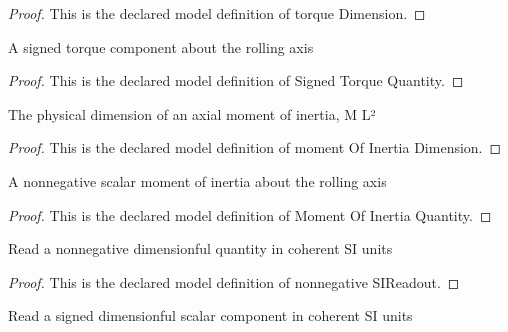 \begin{proof}
  This is the declared model definition of torque Dimension.
\end{proof}
\begin{definition}
  \label{def:physics:phyx-mini-0825:phyxminiproblems-problemphyxmini0825-signedtorquequantity}
  A signed torque component about the rolling axis
\end{definition}
\begin{proof}
  This is the declared model definition of Signed Torque Quantity.
\end{proof}
\begin{definition}
  \label{def:physics:phyx-mini-0825:phyxminiproblems-problemphyxmini0825-momentofinertiadimension}
  The physical dimension of an axial moment of inertia, M L²
\end{definition}
\begin{proof}
  This is the declared model definition of moment Of Inertia Dimension.
\end{proof}
\begin{definition}
  \label{def:physics:phyx-mini-0825:phyxminiproblems-problemphyxmini0825-momentofinertiaquantity}
  A nonnegative scalar moment of inertia about the rolling axis
\end{definition}
\begin{proof}
  This is the declared model definition of Moment Of Inertia Quantity.
\end{proof}
\begin{definition}
  \label{def:physics:phyx-mini-0825:phyxminiproblems-problemphyxmini0825-nonnegativesireadout}
  Read a nonnegative dimensionful quantity in coherent SI units
\end{definition}
\begin{proof}
  This is the declared model definition of nonnegative SIReadout.
\end{proof}
\begin{definition}
  \label{def:physics:phyx-mini-0825:phyxminiproblems-problemphyxmini0825-signedsireadout}
  Read a signed dimensionful scalar component in coherent SI units
\end{definition}
